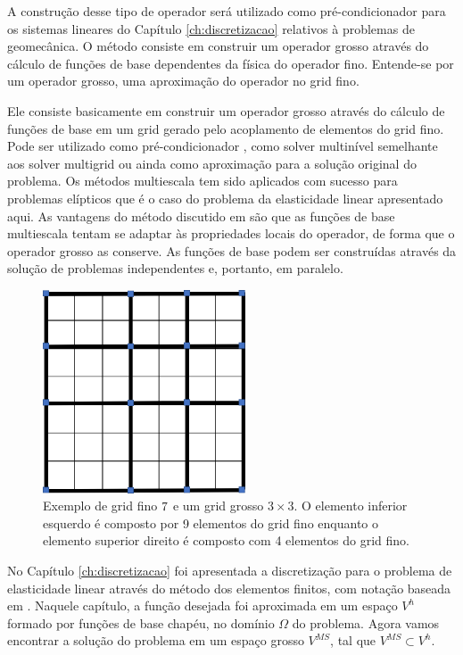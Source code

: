A construção desse tipo de operador será utilizado como pré-condicionador para os  sistemas lineares do Capítulo \ref{ch:discretizacao} relativos à problemas de geomecânica. O método consiste em construir um operador grosso através do cálculo de funções de base dependentes da física do operador fino. Entende-se por um operador grosso, uma aproximação do operador no grid fino.


Ele consiste basicamente em construir um operador grosso através do cálculo de funções de base em um grid gerado pelo acoplamento de elementos do grid fino. Pode ser utilizado como pré-condicionador \cite{casteletto}, como solver multinível semelhante aos solver multigrid ou ainda como aproximação para a solução original do problema. Os métodos multiescala tem sido aplicados com sucesso para problemas elípticos que é o caso do problema da elasticidade linear apresentado aqui. As vantagens do método discutido em \cite{thomashou} são que as funções de base multiescala tentam se adaptar às propriedades locais do operador, de forma que o operador grosso as conserve. As funções de base podem ser construídas através da solução de problemas independentes e, portanto, em paralelo.


\begin{figure}[!htbp]
\centering
\includegraphics[width=6cm]{chap06/figs/grosso.png}
\caption{Exemplo de grid fino $7\time 7$ e um grid grosso $3\times 3$. O elemento inferior esquerdo é composto por 9 elementos do grid fino enquanto o elemento superior direito é composto com 4 elementos do grid fino.}
\label{fig:gridgrosso}

\end{figure}


No Capítulo \ref{ch:discretizacao} foi apresentada a discretização  para o problema de elasticidade linear através do método dos elementos finitos, com notação baseada em \cite{mbuck}. Naquele capítulo, a função desejada foi aproximada em um espaço $V^h$ formado por funções de base chapéu, no domínio $\Omega$ do problema. Agora vamos encontrar a solução do problema em um espaço grosso $V^{MS}$, tal que $V^{MS} \subset V^h$. 



